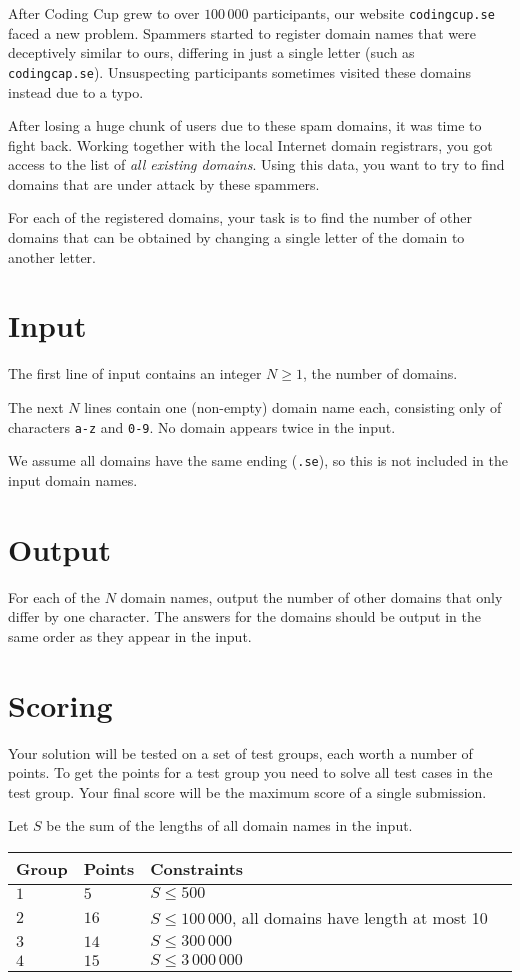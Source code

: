 After Coding Cup grew to over $100\,000$ participants, our website \texttt{codingcup.se} faced a new problem.
Spammers started to register domain names that were deceptively similar to ours, differing in just a single letter (such as \texttt{codingcap.se}).
Unsuspecting participants sometimes visited these domains instead due to a typo.

After losing a huge chunk of users due to these spam domains, it was time to fight back.
Working together with the local Internet domain registrars, you got access to the list of \emph{all existing domains}.
Using this data, you want to try to find domains that are under attack by these spammers.

For each of the registered domains, your task is to find the number of other domains that can be obtained by changing a single letter of the domain to another letter.

\section*{Input}
The first line of input contains an integer $N \ge 1$, the number of domains.

The next $N$ lines contain one (non-empty) domain name each, consisting only of characters \texttt{a-z} and \texttt{0-9}.
No domain appears twice in the input.

We assume all domains have the same ending (\texttt{.se}), so this is not included in the input domain names.

\section*{Output}
For each of the $N$ domain names, output the number of other domains that only differ by one character.
The answers for the domains should be output in the same order as they appear in the input.

\section*{Scoring}
Your solution will be tested on a set of test groups, each worth a number of points.
To get the points for a test group you need to solve all test cases in the test group.
Your final score will be the maximum score of a single submission.

Let $S$ be the sum of the lengths of all domain names in the input.

\noindent
\begin{tabular}{| l | l | l | l |}
\hline
Group & Points & Constraints \\ \hline
$1$   & $5$         & $S \le 500$ \\ \hline
$2$   & $16$         & $S \le 100\,000$, all domains have length at most 10 \\ \hline
$3$   & $14$         & $S \le 300\,000$ \\ \hline
$4$   & $15$         & $S \le 3\,000\,000$ \\ \hline
\end{tabular}
